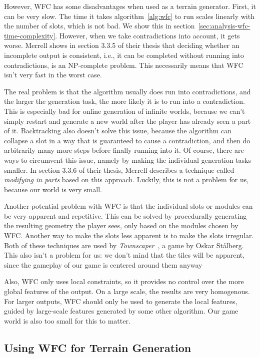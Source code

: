 However, WFC has some disadvantages when used as a terrain generator.
First, it can be very slow.
The time it takes algorithm~\ref{alg:wfc} to run scales linearly with the number of slots, which is not bad.
We show this in section~\ref{sec:analysis-wfc-time-complexity}.
However, when we take contradictions into account, it gets worse.
Merrell shows in section 3.3.5 of their thesis that deciding whether an incomplete output is consistent, i.e., it can be completed without running into contradictions, is an NP-complete problem.
This necessarily means that WFC isn't very fast in the worst case.

The real problem is that the algorithm usually does run into contradictions, and the larger the generation task, the more likely it is to run into a contradiction.
This is especially bad for online generation of infinite worlds, because we can't simply restart and generate a new world after the player has already seen a part of it.
Backtracking also doesn't solve this issue, because the algorithm can collapse a slot in a way that is guaranteed to cause a contradiction, and then do arbitrarily many more steps before finally running into it.
Of course, there are ways to circumvent this issue, namely by making the individual generation tasks smaller.
In section 3.3.6 of their thesis, Merrell describes a technique called \emph{modifying in parts} based on this approach.
Luckily, this is not a problem for us, because our world is very small.

Another potential problem with WFC is that the individual slots or modules can be very apparent and repetitive.
This can be solved by procedurally generating the resulting geometry the player sees, only based on the modules chosen by WFC.
Another way to make the slots less apparent is to make the slots irregular.
Both of these techniques are used by \emph{Townscaper}~\cite{Townscaper}, a game by Oskar St\r{a}lberg.
This also isn't a problem for us: we don't mind that the tiles will be apparent, since the gameplay of our game is centered around them anyway

Also, WFC only uses local constraints, so it provides no control over the more global features of the output.
On a large scale, the results are very homogenous.
For larger outputs, WFC should only be used to generate the local features, guided by large-scale features generated by some other algorithm.
Our game world is also too small for this to matter.

\subsection{Using WFC for Terrain Generation}\label{sec:analysis-our-wfc}

